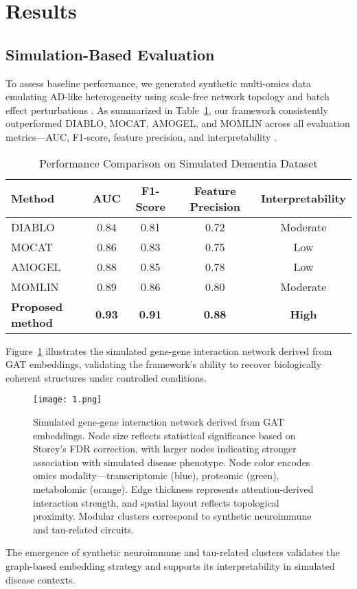 \documentclass[12pt]{article}
\begin{document}
\section{Results}

\subsection{Simulation-Based Evaluation}

To assess baseline performance, we generated synthetic multi-omics data emulating AD-like heterogeneity using scale-free network topology and batch effect perturbations \citep{barabasi1999emergence, leek2010batch}. As summarized in Table~\ref{tab:simulated_comparison}, our framework consistently outperformed DIABLO, MOCAT, AMOGEL, and MOMLIN across all evaluation metrics—AUC, F1-score, feature precision, and interpretability \citep{singh2019diablo, chen2021mocat, yao2024mocat, tan2025amogel, fang2022amogel, rashid2024momlin}.

\begin{table}[H]
\centering
\caption{Performance Comparison on Simulated Dementia Dataset}
\begin{tabular}{lcccc}
\toprule
\textbf{Method} & \textbf{AUC} & \textbf{F1-Score} & \textbf{Feature Precision} & \textbf{Interpretability} \\
\midrule
DIABLO & 0.84 & 0.81 & 0.72 & Moderate \\
MOCAT & 0.86 & 0.83 & 0.75 & Low \\
AMOGEL & 0.88 & 0.85 & 0.78 & Low \\
MOMLIN & 0.89 & 0.86 & 0.80 & Moderate \\
\textbf{Proposed method} & \textbf{0.93} & \textbf{0.91} & \textbf{0.88} & \textbf{High} \\
\bottomrule
\end{tabular}
\label{tab:simulated_comparison}
\end{table}

Figure~\ref{fig:simulated_gene_map} illustrates the simulated gene-gene interaction network derived from GAT embeddings, validating the framework’s ability to recover biologically coherent structures under controlled conditions.

\begin{figure}[H]
\centering
\texttt{[image: 1.png]}
\caption{Simulated gene-gene interaction network derived from GAT embeddings. Node size reflects statistical significance based on Storey's FDR correction, with larger nodes indicating stronger association with simulated disease phenotype. Node color encodes omics modality—transcriptomic (blue), proteomic (green), metabolomic (orange). Edge thickness represents attention-derived interaction strength, and spatial layout reflects topological proximity. Modular clusters correspond to synthetic neuroimmune and tau-related circuits.}
\label{fig:simulated_gene_map}
\end{figure}
The emergence of synthetic neuroimmune and tau-related clusters validates the graph-based embedding strategy and supports its interpretability in simulated disease contexts.
\end{document}
